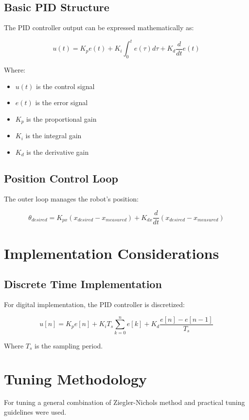 \subsection{Basic PID Structure}
The PID controller output can be expressed mathematically as:

\begin{equation}
	u(t) = K_p e(t) + K_i \int_0^t e(\tau)d\tau + K_d \frac{d}{dt}e(t)
\end{equation}

Where:
\begin{itemize}
	\item $u(t)$ is the control signal
	\item $e(t)$ is the error signal
	\item $K_p$ is the proportional gain
	\item $K_i$ is the integral gain
	\item $K_d$ is the derivative gain
\end{itemize}



\subsection{Position Control Loop}
The outer loop manages the robot's position:

\begin{equation}
	\theta_{desired} = K_{px}(x_{desired} - x_{measured}) + K_{dx}\frac{d}{dt}(x_{desired} - x_{measured})
\end{equation}


\section{Implementation Considerations}
\subsection{Discrete Time Implementation}
For digital implementation, the PID controller is discretized:

\begin{equation}
	u[n] = K_p e[n] + K_i T_s \sum_{k=0}^n e[k] + K_d \frac{e[n] - e[n-1]}{T_s}
\end{equation}

Where $T_s$ is the sampling period.


\section{Tuning Methodology}
For tuning a general combination of Ziegler-Nichols method and practical tuning guidelines were used.
